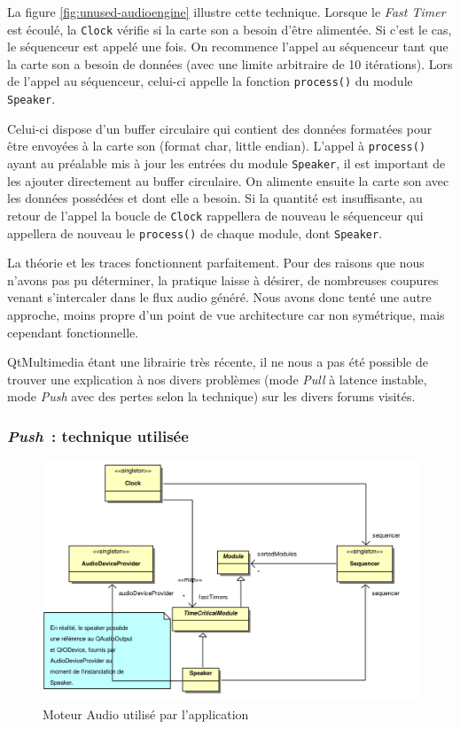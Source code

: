 La figure \ref{fig:unused-audioengine} illustre cette technique.
Lorsque le \emph{Fast Timer} est écoulé, la \verb!Clock! vérifie si
la carte son a besoin d'être alimentée. Si c'est le cas, le
séquenceur est appelé une fois. On recommence l'appel au séquenceur
tant que la carte son a besoin de données (avec une limite
arbitraire de 10 itérations). Lors de l'appel au séquenceur,
celui-ci appelle la fonction \verb!process()! du module
\verb!Speaker!.

Celui-ci dispose d'un buffer circulaire qui contient des données
formatées pour être envoyées à la carte son (format char, little
endian). L'appel à \verb!process()! ayant au préalable mis à jour
les entrées du module \verb!Speaker!, il est important de les
ajouter directement au buffer circulaire. On alimente ensuite la
carte son avec les données possédées et dont elle a besoin. Si la
quantité est insuffisante, au retour de l'appel la boucle de
\verb!Clock! rappellera de nouveau le séquenceur qui appellera de
nouveau le \verb!process()! de chaque module, dont \verb!Speaker!.

La théorie et les traces fonctionnent parfaitement. Pour des
raisons que nous n'avons pas pu déterminer, la pratique laisse à
désirer, de nombreuses coupures venant s'intercaler dans le flux
audio généré. Nous avons donc tenté une autre approche, moins
propre d'un point de vue architecture car non symétrique, mais
cependant fonctionnelle.

QtMultimedia étant une librairie très récente, il ne nous a pas été
possible de trouver une explication à nos divers problèmes (mode
\emph{Pull} à latence instable, mode \emph{Push} avec des pertes
selon la technique) sur les divers forums visités.

\subsubsection{\emph{Push}~: technique utilisée}

\begin{figure}[ht]
\centering
\includegraphics[width=17cm]{../img/ps/psm_currentAudioEngine.pdf}
\caption{Moteur Audio utilisé par l'application}
\label{fig:audioengine}
\end{figure}

